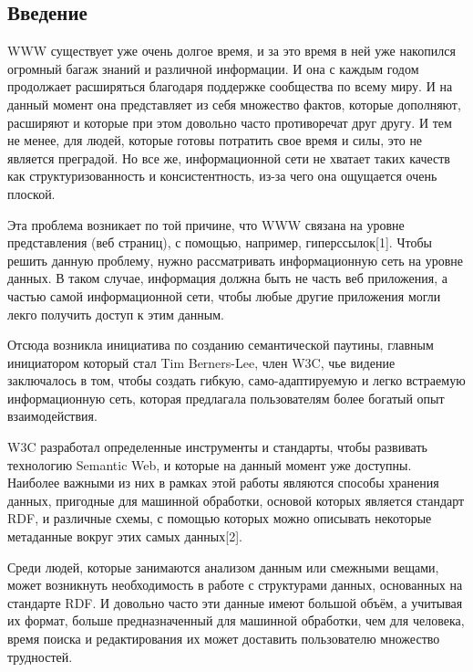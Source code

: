 \documentclass[12pt]{article}
\newcommand{\anonsection}[1]{\section*{#1}\addcontentsline{toc}{section}{#1}}
\begin{document}
\pagebreak

\begin{center}
    {\anonsection{Введение}}
\end{center}

WWW существует уже очень долгое время, и за это время в ней уже накопился огромный багаж знаний и различной информации. И она с каждым годом продолжает расширяться благодаря поддержке сообщества по всему миру. И на данный момент она представляет из себя множество фактов, которые дополняют, расширяют и которые при этом довольно часто противоречат друг другу. И тем не менее, для людей, которые готовы потратить свое время и силы, это не является преградой. Но все же, информационной сети не хватает таких качеств как структуризованность и консистентность, из-за чего она ощущается очень плоской. \par

Эта проблема возникает по той причине, что WWW связана на уровне представления (веб страниц), с помощью, например, гиперссылок[1]. Чтобы решить данную проблему, нужно рассматривать информационную сеть на уровне данных. В таком случае, информация должна быть не часть веб приложения, а частью самой информационной сети, чтобы любые другие приложения могли лекго получить доступ к этим данным.

Отсюда возникла инициатива по созданию семантической паутины, главным инициатором который стал Tim Berners-Lee, член W3C, чье видение заключалось в том, чтобы создать гибкую, само-адаптируемую и легко встраемую информационную сеть, которая предлагала пользователям более богатый опыт взаимодействия.\par

W3C разработал определенные инструменты и стандарты, чтобы развивать технологию Semantic Web, и которые на данный момент уже доступны. Наиболее важными из них в рамках этой работы являются способы хранения данных, пригодные для машинной обработки, основой которых является стандарт RDF, и различные схемы, с помощью которых можно описывать некоторые метаданные вокруг этих самых данных[2].\par

Среди людей, которые занимаются анализом данным или смежными вещами, может возникнуть необходимость в работе с структурами данных, основанных на стандарте RDF. И довольно часто эти данные имеют большой объём, а учитывая их формат, больше предназначенный для машинной обработки, чем для человека, время поиска и редактирования их может доставить пользователю множество трудностей.
\end{document}
